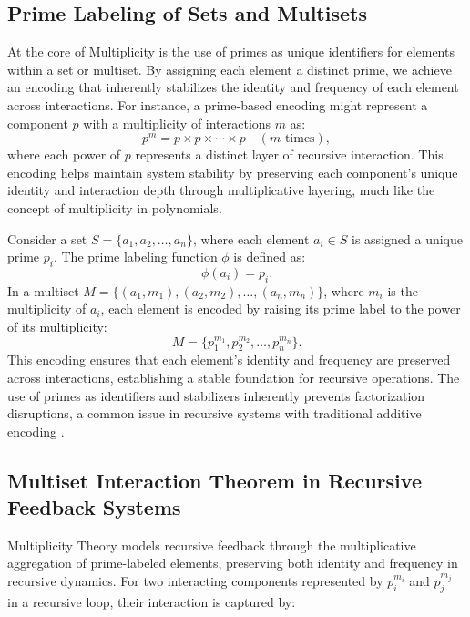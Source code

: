 \documentclass{article}
\theoremstyle{plain}
\begin{document}
\subsection{Prime Labeling of Sets and Multisets}

At the core of Multiplicity is the use of primes as unique identifiers for elements within a set or multiset. By assigning each element a distinct prime, we achieve an encoding that inherently stabilizes the identity and frequency of each element across interactions. 
For instance, a prime-based encoding might represent a component \( p \) with a multiplicity of interactions \( m \) as:
\begin{equation}
p^m = p \times p \times \cdots \times p \quad (m \text{ times}),
\end{equation}
where each power of \( p \) represents a distinct layer of recursive interaction. This encoding helps maintain system stability by preserving each component’s unique identity and interaction depth through multiplicative layering, much like the concept of multiplicity in polynomials.

Consider a set \( S = \{a_1, a_2, \ldots, a_n\} \), where each element \( a_i \in S \) is assigned a unique prime \( p_i \). The prime labeling function \( \phi \) is defined as:
\begin{equation}
\phi(a_i) = p_i.
\end{equation}
In a multiset \( M = \{(a_1, m_1), (a_2, m_2), \ldots, (a_n, m_n)\} \), where \( m_i \) is the multiplicity of \( a_i \), each element is encoded by raising its prime label to the power of its multiplicity:
\begin{equation}
M = \{p_1^{m_1}, p_2^{m_2}, \ldots, p_n^{m_n}\}.
\end{equation}
This encoding ensures that each element's identity and frequency are preserved across interactions, establishing a stable foundation for recursive operations. The use of primes as identifiers and stabilizers inherently prevents factorization disruptions, a common issue in recursive systems with traditional additive encoding \citep{gauss1801, freeman2004}.

\subsection{Multiset Interaction Theorem in Recursive Feedback Systems}

Multiplicity Theory models recursive feedback through the multiplicative aggregation of prime-labeled elements, preserving both identity and frequency in recursive dynamics. For two interacting components represented by \( p_i^{m_i} \) and \( p_j^{m_j} \) in a recursive loop, their interaction is captured by:
\end{document}
